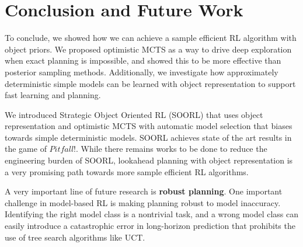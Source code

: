 \section{Conclusion and Future Work}
To conclude, we showed how we can achieve a sample efficient RL algorithm with object priors. We proposed optimistic MCTS as a way to drive deep exploration when exact planning is impossible, and showed this to be more effective than posterior sampling methods. Additionally, we investigate how approximately deterministic simple models can be learned with object representation to support fast learning and planning.

We introduced Strategic Object Oriented RL (SOORL) that uses object representation and optimistic MCTS with automatic model selection that biases towards simple deterministic models. SOORL achieves state of the art results in the game of $\textit{Pitfall!}$. While there remains works to be done to reduce the engineering burden of SOORL, lookahead planning with object representation is a very promising path towards more sample efficient RL algorithms.

A very important line of future research is \textbf{robust planning}. One important challenge in model-based RL is making planning robust to model
inaccuracy. Identifying the right model class is a nontrivial task, and a wrong model class can
easily introduce a catastrophic error in long-horizon prediction that prohibits the use of tree search
algorithms like UCT.

